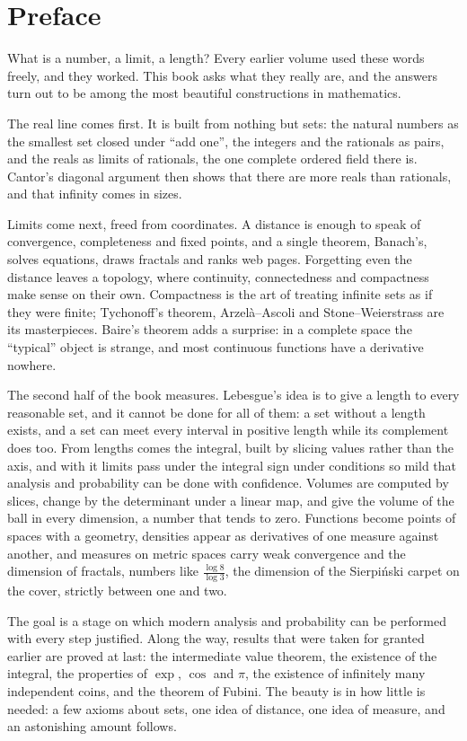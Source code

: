 \chapter*{Preface}
What is a number, a limit, a length? Every earlier volume used these words freely, and they worked. This book asks
what they really are, and the answers turn out to be among the most beautiful constructions in mathematics.

The real line comes first. It is built from nothing but sets: the natural numbers as the smallest set closed under
``add one'', the integers and the rationals as pairs, and the reals as limits of rationals, the one complete
ordered field there is. Cantor's diagonal argument then shows that there are more reals than rationals, and that
infinity comes in sizes.

Limits come next, freed from coordinates. A distance is enough to speak of convergence, completeness and fixed
points, and a single theorem, Banach's, solves equations, draws fractals and ranks web pages. Forgetting even the
distance leaves a topology, where continuity, connectedness and compactness make sense on their own. Compactness is
the art of treating infinite sets as if they were finite; Tychonoff's theorem, Arzel\`a--Ascoli and
Stone--Weierstrass are its masterpieces. Baire's theorem adds a surprise: in a complete space the ``typical'' object
is strange, and most continuous functions have a derivative nowhere.

The second half of the book measures. Lebesgue's idea is to give a length to every reasonable set, and it cannot be
done for all of them: a set without a length exists, and a set can meet every interval in positive length while its complement does too.
From lengths comes the integral, built by slicing values rather than the axis, and with it limits pass under the
integral sign under conditions so mild that analysis and probability can be done with confidence. Volumes are
computed by slices, change by the determinant under a linear map, and give the volume of the ball in every
dimension, a number that tends to zero. Functions become points of spaces with a geometry, densities appear as
derivatives of one measure against another, and measures on metric spaces carry weak convergence and the dimension
of fractals, numbers like $\frac{\log8}{\log3}$, the dimension of the Sierpi\'nski carpet on the cover, strictly between one and two.

The goal is a stage on which modern analysis and probability can be performed with every step justified. Along the
way, results that were taken for granted earlier are proved at last: the intermediate value theorem, the existence of
the integral, the properties of $\exp$, $\cos$ and $\pi$, the existence of infinitely many independent coins, and
the theorem of Fubini. The beauty is in how little is needed: a few axioms about sets, one idea of distance, one idea
of measure, and an astonishing amount follows.

